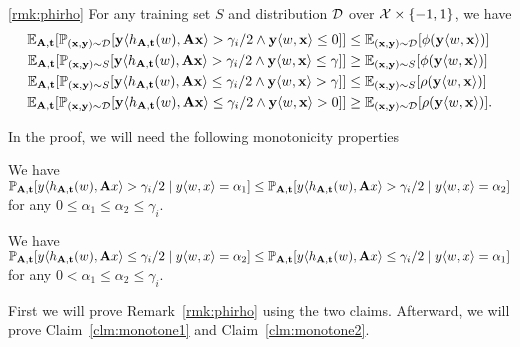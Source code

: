\begin{customrmk}{\ref{rmk:phirho}}
For any training set $S$ and distribution $\mathcal{D}$ over $\mathcal{X} \times \{-1,1\}$, we have
\begin{align*}
    \mathbb{E}_{\mathbf{A},\mathbf{t}} [\mathbb{P}_{(\mathbf{x},\mathbf{y}) \sim \mathcal{D}}[\mathbf{y} \langle h_{\mathbf{A},\mathbf{t}}(w), \mathbf{A} \mathbf{x}\rangle > \gamma_i/2 \wedge \mathbf{y} \langle w, \mathbf{x}\rangle \leq 0]] &\leq\mathbb{E}_{(\mathbf{x},\mathbf{y}) \sim \mathcal{D}}[\phi(\mathbf{y} \langle w, \mathbf{x} \rangle)] \\
    \mathbb{E}_{\mathbf{A},\mathbf{t}} [\mathbb{P}_{(\mathbf{x},\mathbf{y}) \sim S}[\mathbf{y} \langle h_{\mathbf{A},\mathbf{t}}(w), \mathbf{A} \mathbf{x}\rangle > \gamma_i/2 \wedge \mathbf{y} \langle w, \mathbf{x}\rangle \leq \gamma]] &\geq \mathbb{E}_{(\mathbf{x},\mathbf{y}) \sim S}[\phi(\mathbf{y} \langle w, \mathbf{x} \rangle)] \\
    \mathbb{E}_{\mathbf{A},\mathbf{t}} [\mathbb{P}_{(\mathbf{x},\mathbf{y}) \sim S}[\mathbf{y} \langle h_{\mathbf{A},\mathbf{t}}(w), \mathbf{A} \mathbf{x}\rangle \leq \gamma_i/2 \wedge \mathbf{y} \langle w, \mathbf{x}\rangle > \gamma]] &\leq \mathbb{E}_{(\mathbf{x}, \mathbf{y}) \sim S}[\rho(\mathbf{y} \langle w, \mathbf{x} \rangle)]\\
    \mathbb{E}_{\mathbf{A},\mathbf{t}} [\mathbb{P}_{(\mathbf{x},\mathbf{y}) \sim \mathcal{D}}[\mathbf{y} \langle h_{\mathbf{A},\mathbf{t}}(w), \mathbf{A} \mathbf{x}\rangle \leq \gamma_i/2 \wedge \mathbf{y} \langle w, \mathbf{x}\rangle > 0]] &\geq \mathbb{E}_{(\mathbf{x}, \mathbf{y}) \sim \mathcal{D}}[\rho(\mathbf{y}\langle w, \mathbf{x} \rangle)].
\end{align*}
\end{customrmk}
In the proof, we will need the following monotonicity properties 
\begin{claim}
\label{clm:monotone1}
We have $\mathbb{P}_{\mathbf{A},\mathbf{t}}[y \langle h_{\mathbf{A},\mathbf{t}}(w),\mathbf{A} x\rangle > \gamma_i/2 \mid y \langle w,x\rangle=\alpha_1] \leq \mathbb{P}_{\mathbf{A},\mathbf{t}}[y \langle h_{\mathbf{A},\mathbf{t}}(w),\mathbf{A} x\rangle > \gamma_i/2 \mid y \langle w,x\rangle=\alpha_2]$ for any $0 \leq \alpha_1 \leq \alpha_2 \leq \gamma_i$.
\end{claim}
\begin{claim}
\label{clm:monotone2}
We have $\mathbb{P}_{\mathbf{A},\mathbf{t}}[y \langle h_{\mathbf{A},\mathbf{t}}(w),\mathbf{A} x\rangle \leq \gamma_i/2 \mid y \langle w,x\rangle=\alpha_2] \leq \mathbb{P}_{\mathbf{A},\mathbf{t}}[y \langle h_{\mathbf{A},\mathbf{t}}(w),\mathbf{A} x\rangle \leq \gamma_i/2 \mid y \langle w,x\rangle=\alpha_1]$ for any $0 < \alpha_1 \leq \alpha_2 \leq \gamma_i$.
\end{claim}
First we will prove Remark~\ref{rmk:phirho} using the two claims. Afterward, we will prove Claim~\ref{clm:monotone1} and Claim~\ref{clm:monotone2}.

